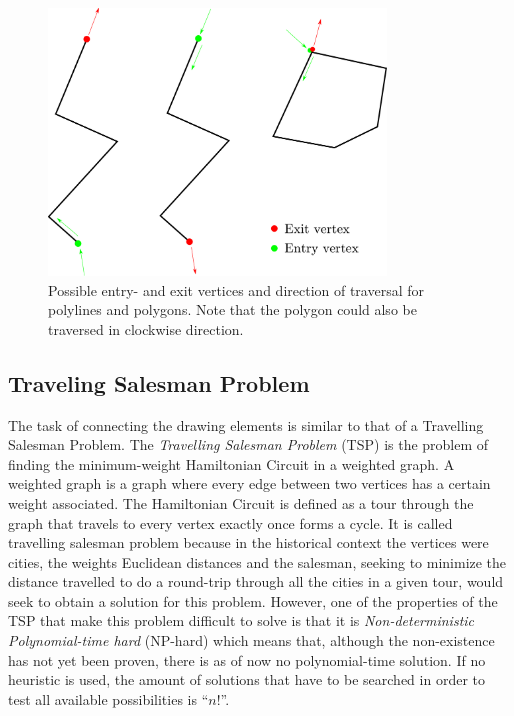 \begin{figure}
\includegraphics[width=0.8\textwidth]{images/path_planning/traversal.pdf}
\caption{Possible entry- and exit vertices and direction of traversal for polylines and polygons. Note that the polygon could also be traversed in clockwise direction.}\label{fig:connect}
\end{figure}

\subsection{Traveling Salesman Problem}

The task of connecting the drawing elements is similar to that of a Travelling Salesman Problem.
The \textit{Travelling Salesman Problem} (TSP) is the problem of finding the minimum-weight Hamiltonian Circuit in a weighted graph. A weighted graph is a graph where every edge between two vertices has a certain weight associated. The Hamiltonian Circuit is defined as a tour through the graph that travels to every vertex exactly once forms a cycle. It is called travelling salesman problem because in the historical context the vertices were cities, the weights Euclidean distances and the salesman, seeking to minimize the distance travelled to do a round-trip through all the cities in a given tour, would seek to obtain a solution for this problem. However, one of the properties of the TSP that make this problem difficult to solve is that it is \textit{Non-deterministic Polynomial-time hard} (NP-hard) which means that, although the non-existence has not yet been proven, there is as of now no polynomial-time solution. If no heuristic is used, the amount of solutions that have to be searched in order to test all available possibilities is \enquote{$n!$}.

